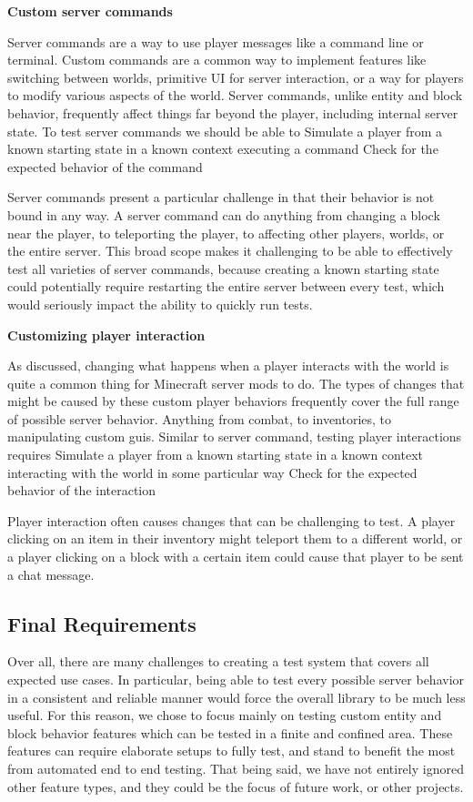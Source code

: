 \documentclass{article}
\begin{document}
\begin{doublespacing}
\noindent \textbf{Custom server commands}

Server commands are a way to use player messages like a command line or terminal. Custom commands are a common way to implement features like switching between worlds, primitive UI for server interaction, or a way for players to modify various aspects of the world. Server commands, unlike entity and block behavior, frequently affect things far beyond the player, including internal server state. To test server commands we should be able to 
Simulate a player from a known starting state in a known context executing a command
Check for the expected behavior of the command

Server commands present a particular challenge in that their behavior is not bound in any way. A server command can do anything from changing a block near the player, to teleporting the player, to affecting other players, worlds, or the entire server. This broad scope makes it challenging to be able to effectively test all varieties of server commands, because creating a known starting state could potentially require restarting the entire server between every test, which would seriously impact the ability to quickly run tests.

\noindent \textbf{Customizing player interaction}

As discussed, changing what happens when a player interacts with the world is quite a common thing for Minecraft server mods to do. The types of changes that might be caused by these custom player behaviors frequently cover the full range of possible server behavior. Anything from combat, to inventories, to manipulating custom guis.  Similar to server command, testing player interactions requires
Simulate a player from a known starting state in a known context interacting with the world in some particular way
Check for the expected behavior of the interaction

Player interaction often causes changes that can be challenging to test. A player clicking on an item in their inventory might teleport them to a different world, or a player clicking on a block with a certain item could cause that player to be sent a chat message. 

\subsection{Final Requirements}

Over all, there are many challenges to creating a test system that covers all expected use cases. In particular, being able to test every possible server behavior in a consistent and reliable manner would force the overall library to be much less useful. For this reason, we chose to focus mainly on testing custom entity and block behavior features which can be tested in a finite and confined area. These features can require elaborate setups to fully test, and stand to benefit the most from automated end to end testing. That being said, we have not entirely ignored other feature types, and they could be the focus of future work, or other projects.


\end{doublespacing}
\end{document}
